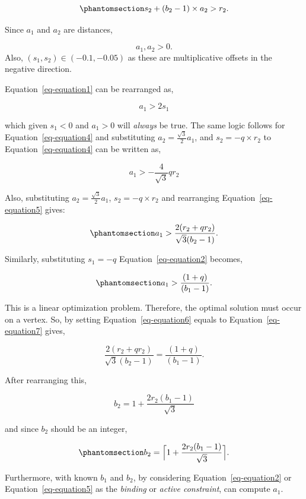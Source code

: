 \documentclass[
  12pt]{article}
\begin{document}
\begin{equation}\phantomsection\label{eq-equation5}{
s_2 + (b_2 - 1) \times a_2 > r_2.
}\end{equation}

Since \(a_1\) and \(a_2\) are distances,

\[
a_1, a_2 > 0.
\] Also, \((s_1, s_2) \in (-0.1, -0.05)\) as these are multiplicative
offsets in the negative direction.

Equation~\ref{eq-equation1} can be rearranged as,

\[
a_1 > 2s_1
\]

which given \(s_1 < 0\) and \(a_1 > 0\) will \emph{always} be true. The
same logic follows for Equation~\ref{eq-equation4} and substituting
\(a_2 = \frac{\sqrt{3}}{2}a_1\), and \(s_2 = -q \times r_2\) to
Equation~\ref{eq-equation4} can be written as,

\[
a_1 > -\frac{4}{\sqrt{3}}qr_2
\]

Also, substituting \(a_2 = \frac{\sqrt{3}}{2}a_1\),
\(s_2 = -q \times r_2\) and rearranging Equation~\ref{eq-equation5}
gives:

\begin{equation}\phantomsection\label{eq-equation6}{
a_1 > \frac{2(r_2 + qr_2)}{\sqrt{3}(b_2 - 1)}.
}\end{equation}

Similarly, substituting \(s_1 = -q\) Equation~\ref{eq-equation2}
becomes,

\begin{equation}\phantomsection\label{eq-equation7}{
a_1 > \frac{(1 + q)}{(b_1 - 1)}.
}\end{equation}

This is a linear optimization problem. Therefore, the optimal solution
must occur on a vertex. So, by setting Equation~\ref{eq-equation6}
equals to Equation~\ref{eq-equation7} gives,

\[
\frac{2(r_2 + qr_2)}{\sqrt{3}(b_2 - 1)} = \frac{(1 + q)}{(b_1 - 1)}.
\]

After rearranging this,

\[
b_2 = 1 + \frac{2r_2(b_1 - 1)}{\sqrt{3}}
\]

and since \(b_2\) should be an integer,

\begin{equation}\phantomsection\label{eq-equation8}{
b_2 = \Big\lceil1 +\frac{2r_2(b_1 - 1)}{\sqrt{3}}\Big\rceil.
}\end{equation}

Furthermore, with known \(b_1\) and \(b_2\), by considering
Equation~\ref{eq-equation2} or Equation~\ref{eq-equation5} as the
\emph{binding} or \emph{active constraint}, can compute \(a_1\).
\end{document}
